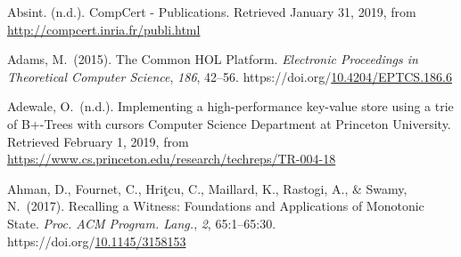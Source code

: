 \documentclass[12pt,twoside]{article}
\begin{document}
{\mdsupressbiblabel{}\begin{thebibliography}{222}%
\label{sec-bibliography}%

\mdbibitemlabel{[Absint, n.d.]}Absint. (n.d.). CompCert - Publications. Retrieved January 31, 2019, from \href{http://compcert.inria.fr/publi.html}{{\ttfamily http://\hspace{0pt}compcert.\hspace{0pt}inria.\hspace{0pt}fr/\hspace{0pt}publi.\hspace{0pt}html}}\label{absint_compcert_nodate}%

\mdbibitemlabel{[Adams, 2015]}Adams, M.~(2015). The Common HOL Platform. \emph{Electronic Proceedings in Theoretical Computer Science}, \emph{186}, 42–56. https://doi.org/\href{https://dx.doi.org/10.4204/EPTCS.186.6}{10.4204/EPTCS.186.6}\label{adams_common_2015}%

\mdbibitemlabel{[Adewale, n.d.]}Adewale, O.~(n.d.). Implementing a high-performance key-value store using a trie of B+-Trees with cursors \textbar{} Computer Science Department at Princeton University. Retrieved February 1, 2019, from \href{https://www.cs.princeton.edu/research/techreps/TR-004-18}{{\ttfamily https://\hspace{0pt}www.\hspace{0pt}cs.\hspace{0pt}princeton.\hspace{0pt}edu/\hspace{0pt}research/\hspace{0pt}techreps/\hspace{0pt}TR-\hspace{0pt}004-\hspace{0pt}18}}\label{adewale_implementing_nodate}%

Ahman, D., Fournet, C., Hriţcu, C., Maillard, K., Rastogi, A., \& Swamy, N.~(2017). Recalling a Witness: Foundations and Applications of Monotonic State. \emph{Proc. ACM Program. Lang.}, \emph{2}, 65:1–65:30. https://doi.org/\href{https://dx.doi.org/10.1145/3158153}{10.1145/3158153}\label{ahman_recalling_2017}%


\end{thebibliography}}
\end{document}
